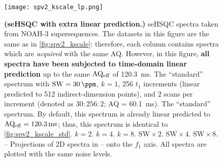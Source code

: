 \begin{figure}
    \centering
    \texttt{[image: spv2\_kscale\_lp.png]}
    {\label{fig:spv2_kscale_lp_std}}
    {\label{fig:spv2_kscale_lp_k2}}
    {\label{fig:spv2_kscale_lp_k4}}
    {\label{fig:spv2_kscale_lp_k8}}
    {\label{fig:spv2_kscale_lp_sw2}}
    {\label{fig:spv2_kscale_lp_sw4}}
    {\label{fig:spv2_kscale_lp_sw8}}
    {\label{fig:spv2_kscale_lp_std_proj}}
    {\label{fig:spv2_kscale_lp_k2_proj}}
    {\label{fig:spv2_kscale_lp_k4_proj}}
    {\label{fig:spv2_kscale_lp_k8_proj}}
    {\label{fig:spv2_kscale_lp_sw2_proj}}
    {\label{fig:spv2_kscale_lp_sw4_proj}}
    {\label{fig:spv2_kscale_lp_sw8_proj}}
    \caption{
        \textbf{(seHSQC with extra linear prediction.)}
        \nitrogen{} seHSQC spectra taken from NOAH-3  supersequences.
        The datasets in this figure are the same as in \cref{fig:spv2_kscale}: therefore, each column contains spectra which are \textit{acquired} with the same AQ.
        However, in this figure, \textbf{all spectra have been subjected to time-domain linear prediction} up to the same $\mathrm{AQ_{eff}}$ of \SI{120.3}{\ms}.
        \textbf{} The ``standard'' spectrum with $\mathrm{SW} = \SI{30}{\ppm}$, $k = 1$, 256 $t_1$ increments (linear predicted to 512 indirect-dimension points), and 2 scans per increment (denoted as $30:256:2$; AQ = \SI{60.1}{\ms}).
        \textbf{} The ``standard'' spectrum.
        By default, this spectrum is already linear predicted to $\aqeff = \SI{120.3}{\ms}$; thus, this spectrum is identical to \cref{fig:spv2_kscale_std}.
        \textbf{} $k = 2$.
        \textbf{} $k = 4$.
        \textbf{} $k = 8$.
        \textbf{} $\mathrm{SW} \times 2$.
        \textbf{} $\mathrm{SW} \times 4$.
        \textbf{} $\mathrm{SW} \times 8$.
        \textbf{}--\textbf{} Projections of 2D spectra in -- onto the $f_1$ axis.
        All spectra are plotted with the same noise levels.
}
\end{figure}
